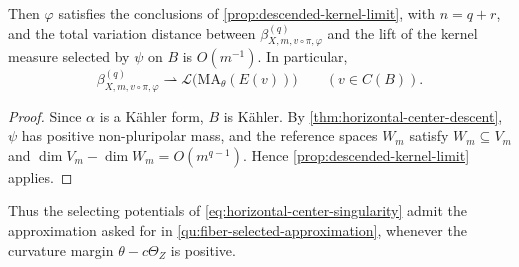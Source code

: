 \begin{corollary}\label{cor:horizontal-center-kernel-limit}
Then $\varphi$ satisfies the conclusions of \cref{prop:descended-kernel-limit}, with $n=q+r$, and the total variation distance between $\beta_{X,m,v\circ\pi,\varphi}^{(q)}$ and the lift of the kernel measure selected by $\psi$ on $B$ is $O(m^{-1})$. In particular,
\[
 \beta_{X,m,v\circ\pi,\varphi}^{(q)}
    \rightharpoonup\mathcal L\bigl(\mathrm{MA}_\theta(E(v))\bigr)
 \qquad(v\in C(B)).
\]
\end{corollary}
\begin{proof}
Since $\alpha$ is a K\"ahler form, $B$ is K\"ahler. By \cref{thm:horizontal-center-descent}, $\psi$ has positive non-pluripolar mass, and the reference spaces $W_m$ satisfy $W_m\subseteq V_m$ and $\dim V_m-\dim W_m=O(m^{q-1})$. Hence \cref{prop:descended-kernel-limit} applies.
\end{proof}

Thus the selecting potentials of \eqref{eq:horizontal-center-singularity} admit the approximation asked for in \cref{qu:fiber-selected-approximation}, whenever the curvature margin $\theta-c\Theta_Z$ is positive.


